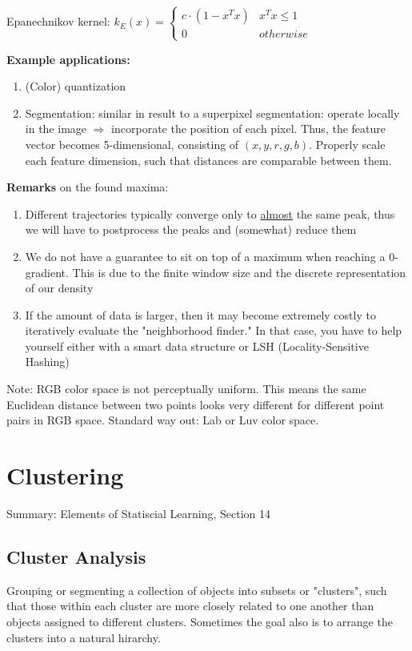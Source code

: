 \documentclass{scrartcl}
\begin{document}
Epanechnikov kernel: \(k_{E} (x) = 
\begin{cases} 
    c \cdot (1-x^Tx) & x^Tx \leq 1\\
    0 & otherwise
\end{cases}\) 

\textbf{Example applications:}
\begin{enumerate}
    \item
        (Color) quantization
    \item
        Segmentation: similar in result to a superpixel segmentation: operate locally in the image \(\Rightarrow\) incorporate the position of each pixel. Thus, the feature vector becomes 5-dimensional, consisting of \((x, y, r, g, b)\). Properly scale each feature dimension, such that distances are comparable between them.
\end{enumerate}

\textbf{Remarks} on the found maxima:
\begin{enumerate}
    \item
        Different trajectories typically converge only to \underline{almost} the same peak, thus we will have to postprocess the peaks and (somewhat) reduce them
    \item
        We do not have a guarantee to sit on top of a maximum when reaching a 0-gradient. This is due to the finite window size and the discrete representation of our density
    \item
        If the amount of data is larger, then it may become extremely costly to iteratively evaluate the "neighborhood finder." In that case, you have to help yourself either with a smart data structure or LSH (Locality-Sensitive Hashing)
\end{enumerate}

Note: RGB color space is not perceptually uniform. This means the same Euclidean distance between two points looks very different for different point pairs in RGB space. Standard way out: Lab or Luv color space.

\section{Clustering}
Summary: Elements of Statiscial Learning, Section 14
\subsection{Cluster Analysis}
Grouping or segmenting a collection of objects into subsets or "clusters", such that those within each cluster are more closely related to one another than objects assigned to different clusters. Sometimes the goal also is to arrange the clusters into a natural hirarchy.
\end{document}
